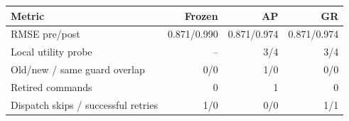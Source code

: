 \begin{tabular}{lrrr}
\toprule
Metric & Frozen & AP & GR \\
\midrule
RMSE pre/post & 0.871/0.990 & 0.871/0.974 & 0.871/0.974 \\
Local utility probe & -- & 3/4 & 3/4 \\
Old/new / same guard overlap & 0/0 & 1/0 & 0/0 \\
Retired commands & 0 & 1 & 0 \\
Dispatch skips / successful retries & 1/0 & 0/0 & 1/1 \\
\bottomrule
\end{tabular}
